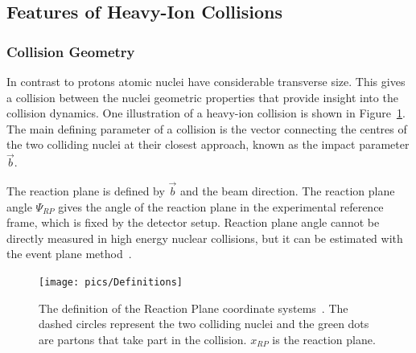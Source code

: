 \pagebreak
\FloatBarrier
\subsection{Features of Heavy-Ion Collisions}
\label{sec:features}
\subsubsection{Collision Geometry}
\label{sec:geometry}
In contrast to protons atomic nuclei have considerable transverse size. This gives a collision between the nuclei geometric properties that provide insight into the collision dynamics.  One illustration of a heavy-ion collision is shown in Figure~\ref{fig:planes}. The main defining parameter of a collision is the vector connecting the centres of the two colliding nuclei at their closest approach, known as the impact parameter $\vec b$.

The reaction plane is defined by $\vec b$ and the beam direction. The reaction plane angle $\Psi_{RP}$ gives the angle of the reaction plane in the experimental reference frame, which is fixed by the detector setup. Reaction plane angle cannot be directly measured in high energy nuclear collisions, but it can be estimated with the event plane method~\cite{Voloshin:2008dg}. 
\begin{figure}[h!]
\centering
%      

\texttt{[image: pics/Definitions]}
\caption[The definitions of the Reaction Plane coordinate systems]{The definition of the Reaction Plane coordinate systems~\cite{Voloshin:2007pc}. The dashed circles represent the two colliding nuclei and the green dots are partons that take part in the collision. $x_{RP}$ is the reaction plane.} %
\label{fig:planes}
\end{figure}


